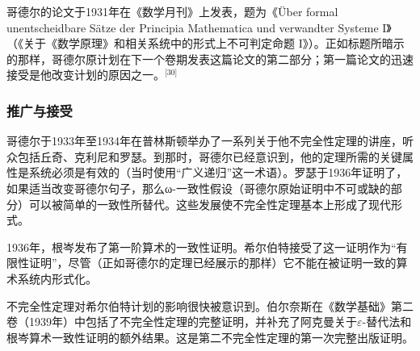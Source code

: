 哥德尔的论文于1931年在《数学月刊》上发表，题为《Über formal unentscheidbare Sätze der Principia Mathematica und verwandter Systeme I》（《关于《数学原理》和相关系统中的形式上不可判定命题 I》）。正如标题所暗示的那样，哥德尔原计划在下一个卷期发表这篇论文的第二部分；第一篇论文的迅速接受是他改变计划的原因之一。\(^\text{[30]}\)
\subsubsection{推广与接受}  
哥德尔于1933年至1934年在普林斯顿举办了一系列关于他不完全性定理的讲座，听众包括丘奇、克利尼和罗瑟。到那时，哥德尔已经意识到，他的定理所需的关键属性是系统必须是有效的（当时使用“广义递归”这一术语）。罗瑟于1936年证明了，如果适当改变哥德尔句子，那么ω-一致性假设（哥德尔原始证明中不可或缺的部分）可以被简单的一致性所替代。这些发展使不完全性定理基本上形成了现代形式。

1936年，根岑发布了第一阶算术的一致性证明。希尔伯特接受了这一证明作为“有限性证明”，尽管（正如哥德尔的定理已经展示的那样）它不能在被证明一致的算术系统内形式化。

不完全性定理对希尔伯特计划的影响很快被意识到。伯尔奈斯在《数学基础》第二卷（1939年）中包括了不完全性定理的完整证明，并补充了阿克曼关于\(\varepsilon\)-替代法和根岑算术一致性证明的额外结果。这是第二不完全性定理的第一次完整出版证明。
